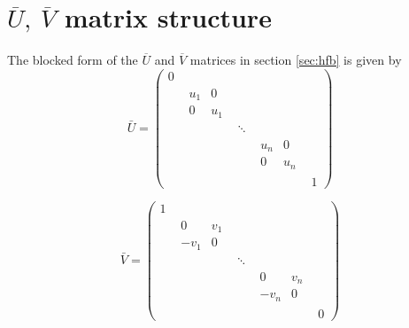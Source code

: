 \section{$\overline U,\ \overline V$ matrix structure}
\label{app:uv}
The blocked form of the $\overline U$ and $\overline V$ matrices in section \ref{sec:hfb} is given by
\[
\bar{U} =
\begin{pmatrix}
0 &        &        &        &        \\
  & \begin{matrix} u_1 & 0 \\ 0 & u_1 \end{matrix} &        &        &        \\
  &        & \ddots &        &        \\
  &        &        & \begin{matrix} u_n & 0 \\ 0 & u_n \end{matrix} &        \\
  &        &        &        & 1
\end{pmatrix}
\]

\[
\bar{V} =
\begin{pmatrix}
1 &        &        &        &        \\
  & \begin{matrix} 0 & v_1 \\ -v_1 & 0 \end{matrix} &        &        &        \\
  &        & \ddots &        &        \\
  &        &        & \begin{matrix} 0 & v_n \\ -v_n & 0 \end{matrix} &        \\
  &        &        &        & 0
\end{pmatrix}
\]
